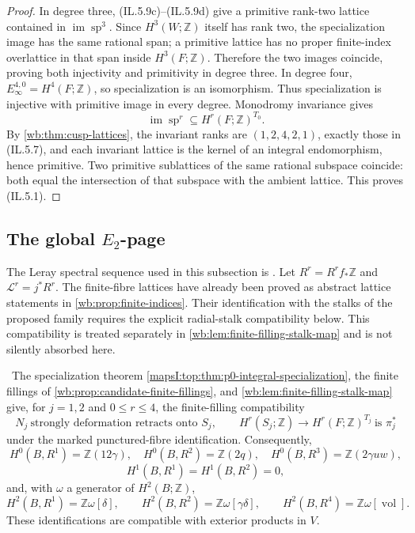 \begin{proof}
In degree three, (IL.5.9c)--(IL.5.9d) give a primitive rank-two lattice contained
in \(\operatorname{im}\operatorname{sp}^3\).  Since
\(H^3(W;\mathbb Z)\) itself has rank two, the specialization image has the
same rational span; a primitive lattice has no proper finite-index
overlattice in that span inside \(H^3(F;\mathbb Z)\).  Therefore the two
images coincide, proving both injectivity and primitivity in degree three.
In degree four, \(E_\infty^{4,0}=H^4(F;\mathbb Z)\), so specialization is an
isomorphism.  Thus specialization is injective with primitive image in every
degree.  Monodromy invariance gives
\[
 \operatorname{im}\operatorname{sp}^r
 \subseteq H^r(F;\mathbb Z)^{T_0}.
\]
By \cref{wb:thm:cusp-lattices}, the invariant ranks are
\((1,2,4,2,1)\), exactly those in (IL.5.7), and each invariant lattice is the
kernel of an integral endomorphism, hence primitive.  Two primitive
sublattices of the same rational subspace coincide: both equal the
intersection of that subspace with the ambient lattice.  This proves (IL.5.1).
\end{proof}

\subsection{The global \texorpdfstring{\(E_2\)}{E2}-page}

The Leray spectral sequence used in this subsection is
\cite[Corollary~2.3.4]{Dimca2004}.
Let \(R^r=R^rf_*\mathbb Z\) and
\(\mathcal L^r=j^*R^r\).  The finite-fibre lattices have already been proved
as abstract lattice statements in \cref{wb:prop:finite-indices}.  Their
identification with the stalks of the proposed family requires the explicit
radial-stalk compatibility below.  This compatibility is treated separately
in \cref{wb:lem:finite-filling-stalk-map} and is not silently absorbed here.

\begin{proposition}
\label{mapsI:top:prop:leray-e2}
\ The specialization theorem
\cref{mapsI:top:thm:p0-integral-specialization}, the finite fillings of
\cref{wb:prop:candidate-finite-fillings}, and
\cref{wb:lem:finite-filling-stalk-map} give, for \(j=1,2\) and
\(0\le r\le4\), the finite-filling compatibility
\[
\tag{IL.FF}
 N_j\ \text{strongly deformation retracts onto }S_j,\qquad
 H^r(S_j;\mathbb Z)\longrightarrow H^r(F;\mathbb Z)^{T_j}
 \ \text{is }\pi_j^*
\]
under the marked punctured-fibre identification.  Consequently,
\[
H^0(B,R^1)=\mathbb Z(12\gamma),\quad
H^0(B,R^2)=\mathbb Z(2q),\quad
H^0(B,R^3)=\mathbb Z(2\gamma uw),
\tag{IL.5.10}
\]
\[
 H^1(B,R^1)=H^1(B,R^2)=0,
\tag{IL.5.11}
\]
and, with \(\omega\) a generator of \(H^2(B;\mathbb Z)\),
\[
H^2(B,R^1)=\mathbb Z\omega[\delta],\qquad
H^2(B,R^2)=\mathbb Z\omega[\gamma\delta],\qquad
H^2(B,R^4)=\mathbb Z\omega[\operatorname{vol}].
\tag{IL.5.12}
\]
These identifications are compatible with exterior products in \(V\).
\end{proposition}

